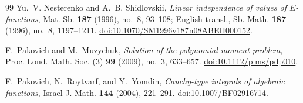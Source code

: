 \documentclass[11pt]{article}
\numberwithin{equation}{section}
\theoremstyle{definition}
\theoremstyle{remark}
\begin{document}
\begin{thebibliography}{99}
Yu.~V. Nesterenko and A.~B. Shidlovskii,
\emph{Linear independence of values of $E$-functions},
Mat. Sb. \textbf{187} (1996), no.~8, 93--108;
English transl., Sb. Math. \textbf{187} (1996), no.~8, 1197--1211.
\href{https://doi.org/10.1070/SM1996v187n08ABEH000152}{doi:10.1070/SM1996v187n08ABEH000152}.

F.~Pakovich and M.~Muzychuk,
\emph{Solution of the polynomial moment problem},
Proc. Lond. Math. Soc. (3) \textbf{99} (2009), no.~3, 633--657.
\href{https://doi.org/10.1112/plms/pdp010}{doi:10.1112/plms/pdp010}.

F.~Pakovich, N.~Roytvarf, and Y.~Yomdin,
\emph{Cauchy-type integrals of algebraic functions},
Israel J. Math. \textbf{144} (2004), 221--291.
\href{https://doi.org/10.1007/BF02916714}{doi:10.1007/BF02916714}.

\end{thebibliography}
\end{document}
